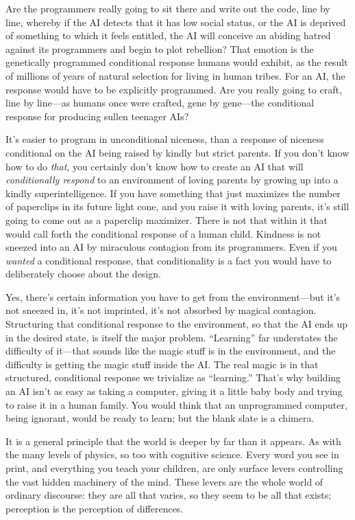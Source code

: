  Are the programmers really going to sit there and write out the
code, line by line, whereby if the AI detects that it has low social
status, or the AI is deprived of something to which it feels entitled,
the AI will conceive an abiding hatred against its programmers and
begin to plot rebellion? That emotion is the genetically programmed
conditional response humans would exhibit, as the result of millions of
years of natural selection for living in human tribes. For an AI, the
response would have to be explicitly programmed. Are you really going
to craft, line by line---as humans once were crafted, gene by
gene---the conditional response for producing sullen teenager AIs?


 It's easier to program in unconditional niceness,
than a response of niceness conditional on the AI being raised by
kindly but strict parents. If you don't know how to do
\textit{that}, you certainly don't know how to create
an AI that will \textit{conditionally respond} to an environment of
loving parents by growing up into a kindly superintelligence. If you
have something that just maximizes the number of paperclips in its
future light cone, and you raise it with loving parents,
it's still going to come out as a paperclip maximizer.
There is not that within it that would call forth the conditional
response of a human child. Kindness is not sneezed into an AI by
miraculous contagion from its programmers. Even if you \textit{wanted}
a conditional response, that conditionality is a fact you would have to
deliberately choose about the design.


 Yes, there's certain information you have to get
from the environment---but it's not sneezed in,
it's not imprinted, it's not absorbed
by magical contagion. Structuring that conditional response to the
environment, so that the AI ends up in the desired state, is itself the
major problem. ``Learning'' far
understates the difficulty of it---that sounds like the magic stuff is
in the environment, and the difficulty is getting the magic stuff
inside the AI. The real magic is in that structured, conditional
response we trivialize as
``learning.'' That's
why building an AI isn't as easy as taking a computer,
giving it a little baby body and trying to raise it in a human family.
You would think that an unprogrammed computer, being ignorant, would be
ready to learn; but the blank slate is a chimera.


 It is a general principle that the world is deeper by far than it
appears. As with the many levels of physics, so too with cognitive
science. Every word you see in print, and everything you teach your
children, are only surface levers controlling the vast hidden machinery
of the mind. These levers are the whole world of ordinary discourse:
they are all that varies, so they seem to be all that exists;
perception is the perception of differences.


